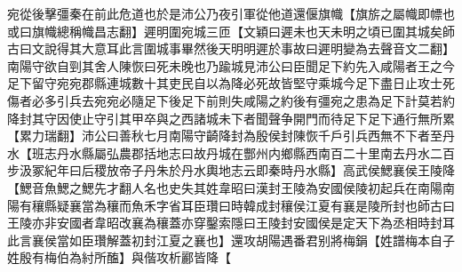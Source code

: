 宛從後擊彊秦在前此危道也於是沛公乃夜引軍從他道還偃旗幟【旗旂之屬幟即幖也或曰旗幟總稱幟昌志翻】遲明圍宛城三匝【文穎曰遲未也天未明之頃已圍其城矣師古曰文說得其大意耳此言圍城事畢然後天明明遲於事故曰遲明變為去聲音文二翻】南陽守欲自剄其舍人陳恢曰死未晚也乃踰城見沛公曰臣聞足下約先入咸陽者王之今足下留守宛宛郡縣連城數十其吏民自以為降必死故皆堅守乘城今足下盡日止攻士死傷者必多引兵去宛宛必隨足下後足下前則失咸陽之約後有彊宛之患為足下計莫若約降封其守因使止守引其甲卒與之西諸城未下者聞聲争開門而待足下足下通行無所累【累力瑞翻】沛公曰善秋七月南陽守齮降封為殷侯封陳恢千戶引兵西無不下者至丹水【班志丹水縣屬弘農郡括地志曰故丹城在酆州内鄉縣西南百二十里南去丹水二百步汲冢紀年曰后稷放帝子丹朱於丹水輿地志云即秦時丹水縣】高武侯鰓襄侯王陵降【鰓音魚鰓之鰓先才翻人名也史失其姓韋昭曰漢封王陵為安國侯陵初起兵在南陽南陽有穰縣疑襄當為穰而魚禾字省耳臣瓚曰時韓成封穰侯江夏有襄是陵所封也師古曰王陵亦非安國者韋昭改襄為穰蓋亦穿鑿索隱曰王陵封安國侯是定天下為丞相時封耳此言襄侯當如臣瓚解蓋初封江夏之襄也】還攻胡陽遇番君别將梅鋗【姓譜梅本自子姓殷有梅伯為紂所醢】與偕攻析酈皆降【